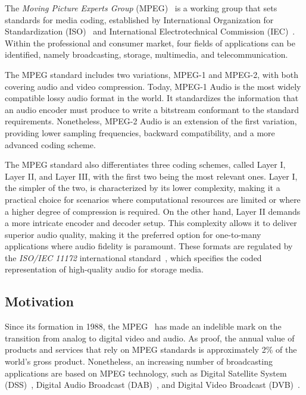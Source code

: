 The \textit{Moving Picture Experts Group} (MPEG)~\cite{MPEG} is a working group that sets standards for media coding, established by International Organization for Standardization (ISO)~\cite{iso} and International Electrotechnical Commission (IEC)~\cite{iec}. Within the professional and consumer market, four fields of applications can be identified, namely broadcasting, storage, multimedia, and telecommunication.

The MPEG standard includes two variations, MPEG-1 and MPEG-2, with both covering audio and video compression.  Today, MPEG-1 Audio is the most widely compatible lossy audio format in the world. It standardizes the information that an audio encoder must produce to write a bitstream conformant to the standard requirements.  Nonetheless, MPEG-2 Audio is an extension of the first variation, providing lower sampling frequencies, backward compatibility, and a more advanced coding scheme.

The MPEG standard also differentiates three coding schemes, called Layer I, Layer II, and Layer III, with the first two being the most relevant ones. 
Layer I, the simpler of the two, is characterized by its lower complexity, making it a practical choice for scenarios where computational resources are limited or where a higher degree of compression is required.
On the other hand, Layer II demands a more intricate encoder and decoder setup. This complexity allows it to deliver superior audio quality, making it the preferred option for one-to-many applications where audio fidelity is paramount.
These formats are regulated by the \textit{ISO/IEC 11172} international standard~\cite{11172}, which specifies the coded representation of high-quality audio for storage media.

\subsection{Motivation}

Since its formation in 1988, the MPEG~\cite{MPEG} has made an indelible mark on the transition from analog to digital video and audio. As proof, the annual value of products and services that rely on MPEG standards is approximately 2\% of the world's gross product. Nonetheless, an increasing number of broadcasting applications are based on MPEG technology, such as Digital Satellite System (DSS)~\cite{dss}, Digital Audio Broadcast (DAB)~\cite{dab}, and Digital Video Broadcast (DVB)~\cite{dvb}. 

